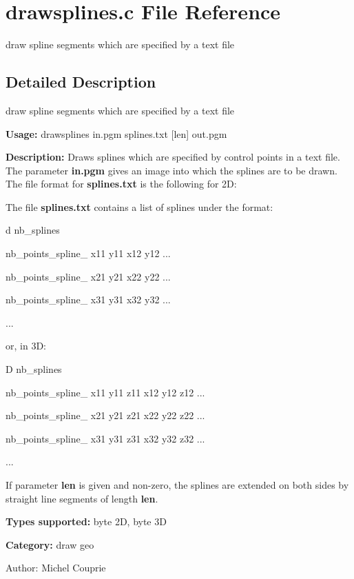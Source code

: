 \section{drawsplines.c File Reference}
\label{drawsplines_8c}
draw spline segments which are specified by a text file  




\label{_details}
\subsection{Detailed Description}
draw spline segments which are specified by a text file 

{\bf Usage:} drawsplines in.pgm splines.txt [len] out.pgm

{\bf Description:} Draws splines which are specified by control points in a text file. The parameter {\bf in.pgm} gives an image into which the splines are to be drawn. The file format for {\bf splines.txt} is the following for 2D:

The file {\bf splines.txt} contains a list of splines under the format:\par
 d nb\_\-splines\par
 nb\_\-points\_\-spline\_ x11 y11 x12 y12 ...\par
 nb\_\-points\_\-spline\_ x21 y21 x22 y22 ...\par
 nb\_\-points\_\-spline\_ x31 y31 x32 y32 ...\par
 ...\par
 or, in 3D:\par
 D nb\_\-splines\par
 nb\_\-points\_\-spline\_ x11 y11 z11 x12 y12 z12 ...\par
 nb\_\-points\_\-spline\_ x21 y21 z21 x22 y22 z22 ...\par
 nb\_\-points\_\-spline\_ x31 y31 z31 x32 y32 z32 ...\par
 ...\par


If parameter {\bf len} is given and non-zero, the splines are extended on both sides by straight line segments of length {\bf len}.

{\bf Types supported:} byte 2D, byte 3D

{\bf Category:} draw geo

\begin{Desc}
\item[Author:]Michel Couprie \end{Desc}
